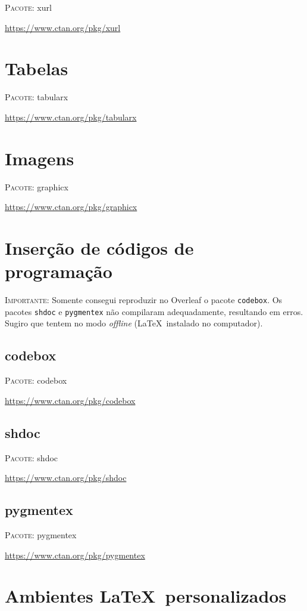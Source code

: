 \documentclass[a4paper,12pt,oneside,openright,extrafontsizes,openbib]{memoir}
\begin{document}
{{\textsc{Pacote:} xurl

\url{https://www.ctan.org/pkg/xurl}

\section{Tabelas}\label{sec:tabularx}

\textsc{Pacote:} tabularx

\url{https://www.ctan.org/pkg/tabularx}

\section{Imagens}\label{sec:graphicx}

\textsc{Pacote:} graphicx

\url{https://www.ctan.org/pkg/graphicx}

\section{Inserção de códigos de programação}\label{sec:codes}

\textsc{Importante:} Somente consegui reproduzir no Overleaf o pacote \verb|codebox|. Os pacotes \verb|shdoc| e \verb|pygmentex| não compilaram adequadamente, resultando em erros. Sugiro que tentem no modo \textit{offline} (\LaTeX\ instalado no computador).

\subsection{codebox}\label{subsec:codebox}
\textsc{Pacote:} codebox

\url{https://www.ctan.org/pkg/codebox}

\subsection{shdoc}\label{subsec:shdoc}
\textsc{Pacote:} shdoc

\url{https://www.ctan.org/pkg/shdoc}

\subsection{pygmentex}\label{subsec:pygmentex}
\textsc{Pacote:} pygmentex

\url{https://www.ctan.org/pkg/pygmentex}

\section{Ambientes \LaTeX\ personalizados}\label{sec:personal}

}}
\end{document}
